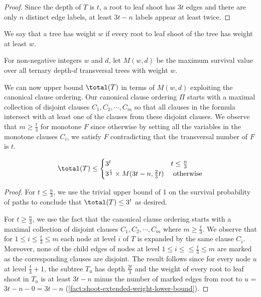 \begin{proof}
Since the depth of $T$ is $t$,
a root to leaf shoot has $3t$ edges and there are only $n$ distinct 
edge labels, at least $3t - n$ labels appear at least twice.
\end{proof}

\begin{definition}
We say that a tree has weight $w$ if every root to leaf shoot of the tree has weight at least $w$.
\end{definition}

\begin{definition}[$M(w, d)$]
For non-negative integers 
$w$ and $d$, 
let $M(w, d)$ be the maximum survival value
over all ternary depth-$d$ transversal trees with weight $w$.
\end{definition}


We can now upper bound $\total(T)$ in terms of $M(w,d)$ 
exploiting the canonical clause ordering.
Our canonical clause ordering $\Pi$ starts with a 
maximal collection of disjoint clauses $C_1, C_2, \cdots, C_m$
so that all clauses in the formula intersect with at least one of the clauses from these disjoint clauses. 
We observe that $m\geq \frac{t}{3}$ for monotone $F$
since otherwise by setting all the variables in the monotone 
clauses $C_i$, we satisfy $F$ contradicting 
that the transversal number of $F$ is $t$.

\begin{lemma}
\label{pess-ntran}
\[
\total(T) \le
\begin{cases}
3^t & t \le \frac{n}{3}\\
3^{\frac{t}{3}}\times M(3t - n, \frac{2}{3}t) & \textrm{ otherwise}
\end{cases}
\]
\end{lemma}

\begin{proof}
For $t\le \frac{n}{3}$, we use the trivial upper 
bound of 1 on the survival probability of paths
to conclude that $\total(T) \le 3^t$ as desired.

For $t \ge \frac{n}{3}$, we use the fact that the canonical clause
ordering starts with a maximal collection of disjoint clauses $C_1, C_2, \cdots, C_m$
where  $m\geq \frac{t}{3}$.
We observe that for $1\leq i\leq \frac{t}{3}\leq m$ 
each node at level $i$ of $T$ is expanded by the same
clause $C_i$.
Moreover, none of  the child edges  of nodes at level $1\leq i\leq \le \frac{t}{3}\leq m$ are marked
as the corresponding clauses are disjoint.
The result follows since
for every node $u$ at level $\frac{t}{3} + 1$, the subtree $T_u$ has depth $\frac{2t}{3}$ and
the weight of
every root to leaf shoot in $T_u$
is at least $3t - n$ minus the number of marked edges from root to $u$ = $3t - n - 0 = 3t - n$ 
(\cref{fact:shoot-extended-weight-lower-bound}).
\end{proof}

